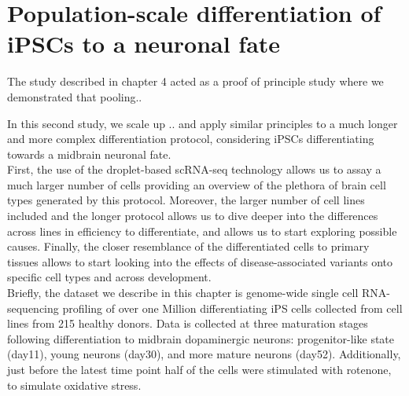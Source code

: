 
\chapter{Population-scale differentiation of iPSCs to a neuronal fate}

The study described in chapter 4 acted as a proof of principle study where we demonstrated that pooling..

In this second study, we scale up .. and apply similar principles to a much longer and more complex differentiation protocol, considering iPSCs differentiating towards a midbrain neuronal fate.\\

First, the use of the droplet-based scRNA-seq technology allows us to assay a much larger number of cells providing an overview of the plethora of brain cell types generated by this protocol. 
Moreover, the larger number of cell lines included and the longer protocol allows us to dive deeper into the differences across lines in efficiency to differentiate, and allows us to start exploring possible causes.
Finally, the closer resemblance of the differentiated cells to primary tissues allows to start looking into the effects of disease-associated variants onto specific cell types and across development. \\

Briefly, the dataset we describe in this chapter is genome-wide single cell RNA-sequencing profiling of over one Million differentiating iPS cells collected from cell lines from 215 healthy donors. 
Data is collected at three maturation stages following differentiation to midbrain dopaminergic neurons: progenitor-like state (day11), young neurons (day30), and more mature neurons (day52). 
Additionally, just before the latest time point half of the cells were stimulated with rotenone, to simulate oxidative stress. 

\newpage


